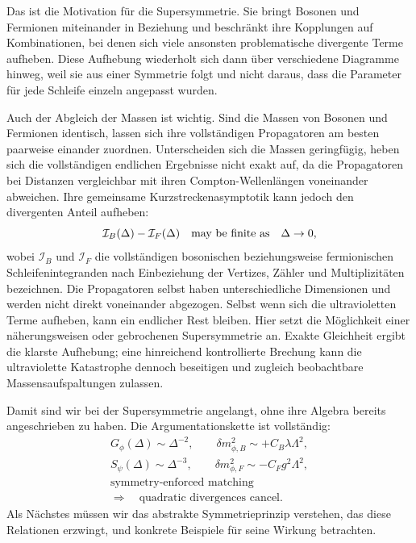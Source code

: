 Das ist die Motivation für die Supersymmetrie. Sie bringt Bosonen und Fermionen miteinander in Beziehung und beschränkt ihre Kopplungen auf Kombinationen, bei denen sich viele ansonsten problematische divergente Terme aufheben. Diese Aufhebung wiederholt sich dann über verschiedene Diagramme hinweg, weil sie aus einer Symmetrie folgt und nicht daraus, dass die Parameter für jede Schleife einzeln angepasst wurden.

Auch der Abgleich der Massen ist wichtig. Sind die Massen von Bosonen und Fermionen identisch, lassen sich ihre vollständigen Propagatoren am besten paarweise einander zuordnen. Unterscheiden sich die Massen geringfügig, heben sich die vollständigen endlichen Ergebnisse nicht exakt auf, da die Propagatoren bei Distanzen vergleichbar mit ihren Compton-Wellenlängen voneinander abweichen. Ihre gemeinsame Kurzstreckenasymptotik kann jedoch den divergenten Anteil aufheben:
\begin{equation}
\mathcal I_B(\Delta)-\mathcal I_F(\Delta)
\quad\hbox{may be finite as}\quad \Delta\to0,
\end{equation}
wobei \(\mathcal I_B\) und \(\mathcal I_F\) die vollständigen bosonischen beziehungsweise fermionischen Schleifenintegranden nach Einbeziehung der Vertizes, Zähler und Multiplizitäten bezeichnen. Die Propagatoren selbst haben unterschiedliche Dimensionen und werden nicht direkt voneinander abgezogen. Selbst wenn sich die ultravioletten Terme aufheben, kann ein endlicher Rest bleiben. Hier setzt die Möglichkeit einer näherungsweisen oder gebrochenen Supersymmetrie an. Exakte Gleichheit ergibt die klarste Aufhebung; eine hinreichend kontrollierte Brechung kann die ultraviolette Katastrophe dennoch beseitigen und zugleich beobachtbare Massensaufspaltungen zulassen.

Damit sind wir bei der Supersymmetrie angelangt, ohne ihre Algebra bereits angeschrieben zu haben. Die Argumentationskette ist vollständig:
\begin{equation}
\begin{gathered}
G_\phi(\Delta)\sim \Delta^{-2},
\qquad
\delta m_{\phi,B}^2\sim+C_B\lambda\Lambda^2,\\[0.4em]
S_\psi(\Delta)\sim \Delta^{-3},
\qquad
\delta m_{\phi,F}^2\sim-C_Fg^2\Lambda^2,\\[0.4em]
\text{symmetry-enforced matching}\\
\Longrightarrow\quad
\text{quadratic divergences cancel}.
\end{gathered}
\end{equation}
Als Nächstes müssen wir das abstrakte Symmetrieprinzip verstehen, das diese Relationen erzwingt, und konkrete Beispiele für seine Wirkung betrachten.